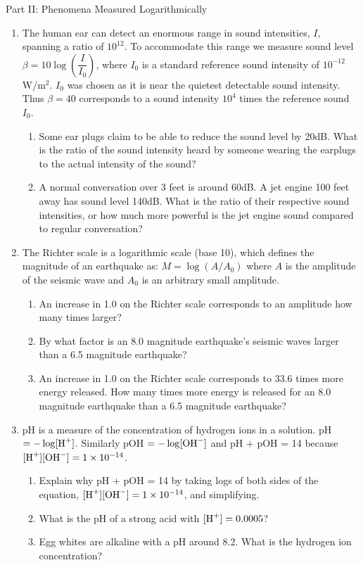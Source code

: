 \documentclass[12pt]{article}
\theoremstyle{plain}     %
\begin{document}
Part II: Phenomena Measured Logarithmically
\begin{enumerate}
	\item The human ear can detect an enormous range in sound intensities, $I$, spanning a ratio of $10^{12}$. To accommodate this range we measure sound level $\beta=10\log\left(\dfrac{I}{I_0}\right)$, where $I_0$ is a standard reference sound intensity of $10^{-12}$ W/m$^2$. $I_0$ was chosen as it is near the quietest detectable sound intensity. Thus $\beta =40$ corresponds to a sound intensity $10^4$ times the reference sound $I_0$.
		\begin{enumerate}
			\item Some ear plugs claim to be able to reduce the sound level by 20dB. What is the ratio of the sound intensity heard by someone wearing the earplugs to the actual intensity of the sound?
			\item A normal conversation over 3 feet is around 60dB.  A jet engine 100 feet away has sound level 140dB. What is the ratio of their respective sound intensities, or how much more powerful is the jet engine sound compared to regular conversation?\\[.5cm]
			
		\end{enumerate}
	
	\item The Richter scale is a logarithmic scale (base 10), which defines the magnitude of an earthquake as: $M= \log(A/A_0)$ where $A$ is the amplitude of the seismic wave and $A_0$ is an arbitrary small amplitude.
		\begin{enumerate}
			\item An increase in 1.0 on the Richter scale corresponds to an amplitude how many times larger?
			\item By what factor is an 8.0 magnitude earthquake's seismic waves larger than a 6.5 magnitude earthquake?
			\item An increase in 1.0 on the Richter scale corresponds to 33.6 times more energy released. How many times more energy is released for an 8.0 magnitude earthquake than a 6.5 magnitude earthquake?\\[.5cm]
		\end{enumerate}
	
	\item pH is a measure of the concentration of hydrogen ions in a solution. pH $=-\log[\textnormal{H}^+]$. Similarly pOH $=-\log[\textnormal{OH}^-]$ and pH + pOH = 14 because $[\textnormal{H}^+][\textnormal{OH}^-]=1\times 10^{-14}$.
		\begin{enumerate}
			\item Explain why pH + pOH = 14 by taking logs of both sides of the equation, $[\textnormal{H}^+][\textnormal{OH}^-]=1\times 10^{-14}$, and simplifying.
			\item What is the pH of a strong acid with $[\textnormal{H}^+]=0.0005$?
			\item Egg whites are alkaline with a pH around 8.2. What is the hydrogen ion concentration?\\[.5cm]
		\end{enumerate}
	
	
\end{enumerate}
	
\end{document}

